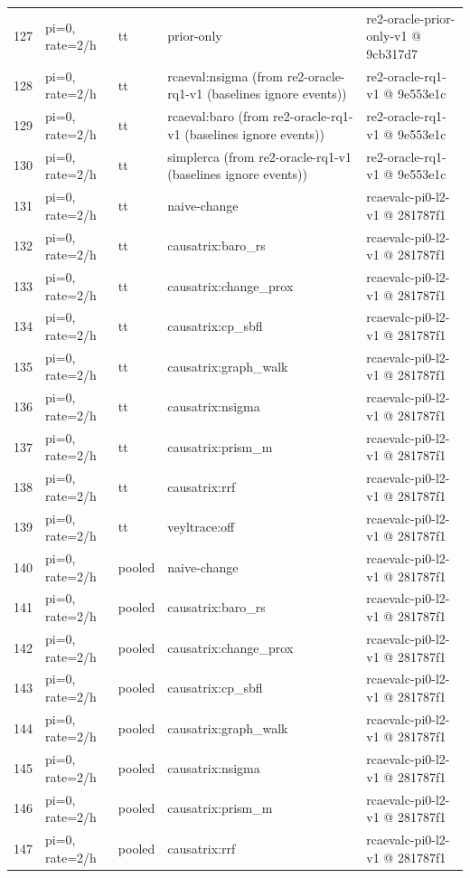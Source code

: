 \begin{longtable}{@{}r>{\raggedright\arraybackslash}p{48.0pt}>{\raggedright\arraybackslash}p{18.0pt}>{\raggedright\arraybackslash}p{108.0pt}>{\raggedright\arraybackslash}p{105.0pt}@{}}
127 & pi=0, rate=2/h & tt & prior-only & re2-oracle-prior-only-v1 @ 9cb317d7 \\
128 & pi=0, rate=2/h & tt & rcaeval:nsigma (from re2-oracle-rq1-v1 (baselines ignore events)) & re2-oracle-rq1-v1 @ 9e553e1c \\
129 & pi=0, rate=2/h & tt & rcaeval:baro (from re2-oracle-rq1-v1 (baselines ignore events)) & re2-oracle-rq1-v1 @ 9e553e1c \\
130 & pi=0, rate=2/h & tt & simplerca (from re2-oracle-rq1-v1 (baselines ignore events)) & re2-oracle-rq1-v1 @ 9e553e1c \\
131 & pi=0, rate=2/h & tt & naive-change & rcaevalc-pi0-l2-v1 @ 281787f1 \\
132 & pi=0, rate=2/h & tt & causatrix:baro\_rs & rcaevalc-pi0-l2-v1 @ 281787f1 \\
133 & pi=0, rate=2/h & tt & causatrix:change\_prox & rcaevalc-pi0-l2-v1 @ 281787f1 \\
134 & pi=0, rate=2/h & tt & causatrix:cp\_sbfl & rcaevalc-pi0-l2-v1 @ 281787f1 \\
135 & pi=0, rate=2/h & tt & causatrix:graph\_walk & rcaevalc-pi0-l2-v1 @ 281787f1 \\
136 & pi=0, rate=2/h & tt & causatrix:nsigma & rcaevalc-pi0-l2-v1 @ 281787f1 \\
137 & pi=0, rate=2/h & tt & causatrix:prism\_m & rcaevalc-pi0-l2-v1 @ 281787f1 \\
138 & pi=0, rate=2/h & tt & causatrix:rrf & rcaevalc-pi0-l2-v1 @ 281787f1 \\
139 & pi=0, rate=2/h & tt & veyltrace:off & rcaevalc-pi0-l2-v1 @ 281787f1 \\
140 & pi=0, rate=2/h & pooled & naive-change & rcaevalc-pi0-l2-v1 @ 281787f1 \\
141 & pi=0, rate=2/h & pooled & causatrix:baro\_rs & rcaevalc-pi0-l2-v1 @ 281787f1 \\
142 & pi=0, rate=2/h & pooled & causatrix:change\_prox & rcaevalc-pi0-l2-v1 @ 281787f1 \\
143 & pi=0, rate=2/h & pooled & causatrix:cp\_sbfl & rcaevalc-pi0-l2-v1 @ 281787f1 \\
144 & pi=0, rate=2/h & pooled & causatrix:graph\_walk & rcaevalc-pi0-l2-v1 @ 281787f1 \\
145 & pi=0, rate=2/h & pooled & causatrix:nsigma & rcaevalc-pi0-l2-v1 @ 281787f1 \\
146 & pi=0, rate=2/h & pooled & causatrix:prism\_m & rcaevalc-pi0-l2-v1 @ 281787f1 \\
147 & pi=0, rate=2/h & pooled & causatrix:rrf & rcaevalc-pi0-l2-v1 @ 281787f1 \\

\end{longtable}
